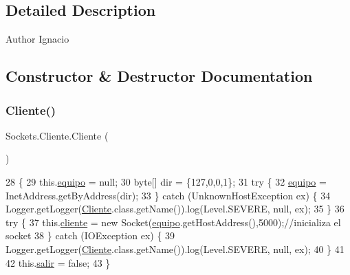 \subsection{Detailed Description}
\begin{DoxyAuthor}{Author}
Ignacio 
\end{DoxyAuthor}


\subsection{Constructor \& Destructor Documentation}
\mbox{\label{class_sockets_1_1_cliente_ab3aed9d5de2bafbb190c27a9c5e7cfd1}} 
\subsubsection{\texorpdfstring{Cliente()}{Cliente()}}
{\footnotesize\ttfamily Sockets.\+Cliente.\+Cliente (\begin{DoxyParamCaption}{ }\end{DoxyParamCaption})\hspace{0.3cm}{\ttfamily [inline]}}


\begin{DoxyCode}
28     \{
29         this.\mbox{\hyperlink{class_sockets_1_1_cliente_a4a8b83baab9f078a2972e51e3f671bf0}{equipo}} = null;
30         byte[] dir = \{127,0,0,1\};
31         \textcolor{keywordflow}{try} \{
32             \mbox{\hyperlink{class_sockets_1_1_cliente_a4a8b83baab9f078a2972e51e3f671bf0}{equipo}} = InetAddress.getByAddress(dir);
33         \} \textcolor{keywordflow}{catch} (UnknownHostException ex) \{
34             Logger.getLogger(\mbox{\hyperlink{class_sockets_1_1_cliente_ab3aed9d5de2bafbb190c27a9c5e7cfd1}{Cliente}}.class.getName()).log(Level.SEVERE, null, ex);
35         \}
36         \textcolor{keywordflow}{try} \{
37             this.\mbox{\hyperlink{class_sockets_1_1_cliente_afe26e0d4cbe42f094ce76f958e15fb58}{cliente}} = \textcolor{keyword}{new} Socket(\mbox{\hyperlink{class_sockets_1_1_cliente_a4a8b83baab9f078a2972e51e3f671bf0}{equipo}}.getHostAddress(),5000);\textcolor{comment}{//inicializa el socket}
38         \} \textcolor{keywordflow}{catch} (IOException ex) \{
39             Logger.getLogger(\mbox{\hyperlink{class_sockets_1_1_cliente_ab3aed9d5de2bafbb190c27a9c5e7cfd1}{Cliente}}.class.getName()).log(Level.SEVERE, null, ex);
40         \}
41         
42         this.\mbox{\hyperlink{class_sockets_1_1_cliente_ab72910fbf98a6c65607aeb382526389a}{salir}} = \textcolor{keyword}{false};
43     \}
\end{DoxyCode}


